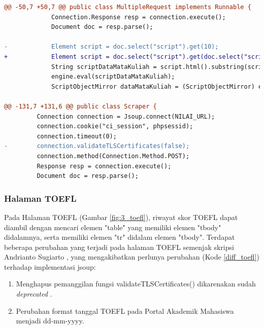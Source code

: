         
        \begin{lstlisting}[language=diff, caption=Perubahan Implementasi Jsoup Halaman Daftar Perkembangan Studi, label=diff_halaman_dps]
@@ -50,7 +50,7 @@ public class MultipleRequest implements Runnable {
             Connection.Response resp = connection.execute();
             Document doc = resp.parse();

-            Element script = doc.select("script").get(10);
+            Element script = doc.select("script").get(doc.select("script").size()-1);
             String scriptDataMataKuliah = script.html().substring(script.html().indexOf("var data_mata_kuliah = [];"), script.html().indexOf("var data_angket = [];"));
             engine.eval(scriptDataMataKuliah);
             ScriptObjectMirror dataMataKuliah = (ScriptObjectMirror) engine.get("data_mata_kuliah");
             
@@ -131,7 +131,6 @@ public class Scraper {
         Connection connection = Jsoup.connect(NILAI_URL);
         connection.cookie("ci_session", phpsessid);
         connection.timeout(0);
-        connection.validateTLSCertificates(false);
         connection.method(Connection.Method.POST);
         Response resp = connection.execute();
         Document doc = resp.parse();
        \end{lstlisting}
        
        
\subsubsection{Halaman TOEFL}
Pada Halaman TOEFL (Gambar \ref{fig:3_toefl}), riwayat skor TOEFL dapat diambil dengan mencari elemen "table" yang memiliki elemen "tbody" didalamnya, serta memiliki elemen "tr" didalam elemen "tbody".
Terdapat beberapa perubahan yang terjadi pada halaman TOEFL semenjak skripsi Andrianto Sugiarto \cite{ifstupor}, yang mengakibatkan perlunya perubahan (Kode \ref{diff_toefl}) terhadap implementasi jsoup:

    \begin{enumerate}
        \item Menghapus pemanggilan fungsi validateTLSCertificates() dikarenakan sudah \textit{deprecated} \cite{jsoup}.
        \item Perubahan format tanggal TOEFL pada Portal Akademik Mahasiswa menjadi dd-mm-yyyy.
    \end{enumerate}
       
